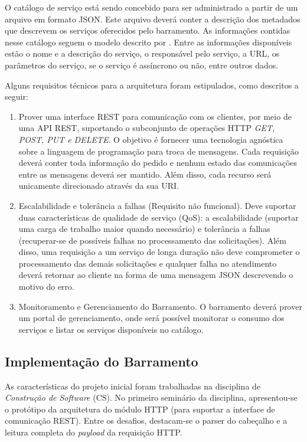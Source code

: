 O catálogo de serviço está sendo concebido para ser administrado a partir 
de um arquivo em formato JSON. Este arquivo deverá conter a descrição dos 
metadados que descrevem os serviços oferecidos pelo barramento. 
As informações contidas nesse catálogo seguem o modelo descrito 
por \cite{OASISRefArch:2012}. Entre as informações disponíveis estão 
o nome e a descrição do serviço, o responsável pelo serviço, a URL, 
os parâmetros do serviço, se o serviço é assíncrono ou não, entre outros dados.

Alguns requisitos técnicos para a arquitetura foram estipulados, como descritos a seguir:

\begin{enumerate}[(RQ1)]

\item Prover uma interface REST para comunicação com os clientes, por meio de uma API REST, suportando o subconjunto de operações HTTP \textit{GET, POST, PUT e DELETE}. 
O objetivo \'{e} fornecer uma tecnologia agnóstica sobre a linguagem de programa\c c\~{a}o
para troca de mensagens. Cada requisição deverá conter toda informação do 
pedido e nenhum estado das comunicações entre as mensagens deverá ser mantido. 
Além disso, cada recurso será unicamente direcionado através da sua URI.

\item Escalabilidade e tolerância a falhas (Requisito não funcional). Deve suportar 
duas características de qualidade de serviço (QoS): a escalabilidade 
(suportar uma carga de trabalho maior quando necessário) e tolerância a falhas 
(recuperar-se de possíveis falhas no processamento das solicitações). Além disso, 
uma requisição a um serviço de longa duração não deve comprometer o processamento 
das demais solicitações e qualquer falha no atendimento deverá retornar ao cliente 
na forma de uma mensagem JSON descrevendo o motivo do erro.

\item Monitoramento e Gerenciamento do Barramento. O barramento deverá prover um portal de gerenciamento, onde será possível monitorar o consumo dos serviços e listar 
os serviços disponíveis no catálogo.

\end{enumerate}


\subsection{Implementação do Barramento}

As características do projeto inicial foram trabalhadas na disciplina de \textit{Construção de Software} (CS). No primeiro seminário da disciplina, apresentou-se o protótipo da arquitetura do módulo HTTP (para suportar a interface de comunicação REST). Entre os desafios, destacam-se o parser do cabeçalho e a leitura completa do \textit{payload} da requisição HTTP.

